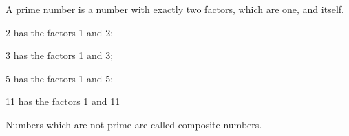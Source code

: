 A prime number is a number with exactly two factors, which are one, and itself.

\par
2 has the factors 1 and 2;  
\par
3  has  the factors 1 and 3;  
\par
5  has the factors 1 and 5;
\par
11 has the factors 1 and 11            

\par
Numbers which are not prime are called composite numbers.